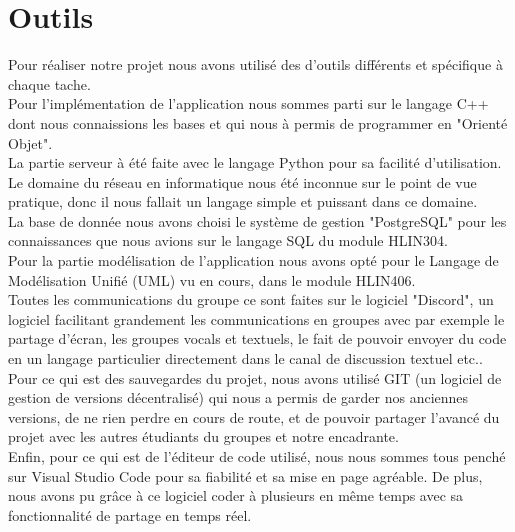 \documentclass{report}
\begin{document}
\section{Outils} %
Pour réaliser notre projet nous avons utilisé des d'outils différents et spécifique à chaque tache. \\

Pour l'implémentation de l'application nous sommes parti sur le langage C++ dont nous connaissions les bases et qui nous à permis de programmer en "Orienté Objet". \\

La partie serveur à été faite avec le langage Python pour sa facilité d'utilisation. Le domaine du réseau en informatique nous été inconnue sur le point de vue pratique, donc il nous fallait un langage simple et puissant dans ce domaine. \\

La base de donnée nous avons choisi le système de gestion "PostgreSQL" pour les connaissances que nous avions sur le langage SQL du module HLIN304. \\

Pour la partie modélisation de l'application nous avons opté pour le Langage de Modélisation Unifié (UML) vu en cours, dans le module HLIN406. \\

Toutes les communications du groupe ce sont faites sur le logiciel "Discord", un logiciel facilitant grandement les communications en groupes avec par exemple le partage d'écran, les groupes vocals et textuels, le fait de pouvoir envoyer du code en un langage particulier directement dans le canal de discussion textuel etc.. \\

Pour ce qui est des sauvegardes du projet, nous avons utilisé GIT (un logiciel de gestion de versions décentralisé) qui nous a permis de garder nos anciennes versions, de ne rien perdre en cours de route, et de pouvoir partager l'avancé du projet avec les autres étudiants du groupes et notre encadrante. \\

Enfin, pour ce qui est de l'éditeur de code utilisé, nous nous sommes tous penché sur Visual Studio Code pour sa fiabilité et sa mise en page agréable. De plus, nous avons pu grâce à ce logiciel coder à plusieurs en même temps avec sa fonctionnalité de partage en temps réel.


\end{document}
